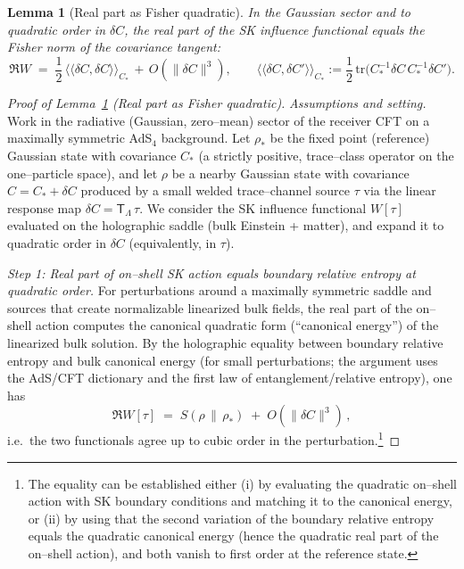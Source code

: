 \documentclass[10pt]{article}
\theoremstyle{definition}
\theoremstyle{plain}
\newtheorem{lemma}{Lemma}[section]
\begin{document}
\begin{lemma}[Real part as Fisher quadratic]
\label{lem:ReW-Fisher}
In the Gaussian sector and to quadratic order in $\delta C$, the real part of the SK influence functional equals the Fisher norm of the covariance tangent:
\[
\Re W\;=\;\frac12\,\big\langle\!\big\langle \delta C,\delta C\big\rangle\!\big\rangle_{C_\ast}
\,+\,O(\|\delta C\|^3),
\qquad
\big\langle\!\big\langle \delta C,\delta C'\big\rangle\!\big\rangle_{C_\ast}
:=\frac12\,\mathrm{tr}\!\big(C_\ast^{-1}\delta C\,C_\ast^{-1}\delta C'\big).
\]
\end{lemma}
\begin{proof}[Proof of Lemma~\ref{lem:ReW-Fisher} (Real part as Fisher quadratic)]
\emph{Assumptions and setting.}
Work in the radiative (Gaussian, zero–mean) sector of the receiver CFT on a maximally symmetric AdS$_4$ background. 
Let $\rho_\ast$ be the fixed point (reference) Gaussian state with covariance $C_\ast$ (a strictly positive, trace–class operator on the one–particle space), and let $\rho$ be a nearby Gaussian state with covariance $C=C_\ast+\delta C$ produced by a small welded trace–channel source $\tau$ via the linear response map $\delta C=\mathsf T_\Lambda\,\tau$. 
We consider the SK influence functional $W[\tau]$ evaluated on the holographic saddle (bulk Einstein + matter), and expand it to quadratic order in $\delta C$ (equivalently, in $\tau$).

\smallskip
\noindent
\emph{Step 1: Real part of on–shell SK action equals boundary relative entropy at quadratic order.}
For perturbations around a maximally symmetric saddle and sources that create normalizable linearized bulk fields, the real part of the on–shell action computes the canonical quadratic form (``canonical energy'') of the linearized bulk solution. 
By the holographic equality between boundary relative entropy and bulk canonical energy (for small perturbations; the argument uses the AdS/CFT dictionary and the first law of entanglement/relative entropy), one has
\begin{equation}
\Re W[\tau]\;=\;S(\rho\,\|\,\rho_\ast)\;+\;O(\|\delta C\|^3)\,,
\label{eq:ReW=RelEnt}
\end{equation}
i.e.\ the two functionals agree up to cubic order in the perturbation.\footnote{The equality can be established either (i) by evaluating the quadratic on–shell action with SK boundary conditions and matching it to the canonical energy, or (ii) by using that the second variation of the boundary relative entropy equals the quadratic canonical energy (hence the quadratic real part of the on–shell action), and both vanish to first order at the reference state.}


\end{proof}
\end{document}

